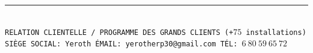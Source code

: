 \documentclass[11pt,a4paper]{memoir}
\begin{document}
\begin{Spacing}{0.75}
\begin{minipage}[t]{42mm}
\begin{flushleft}
{            \vspace*{2mm}
        }
        \end{flushleft}
    \end{minipage}
    \rule{74mm}{0mm}\\
    \vspace{-0.45em}
    \hspace*{-0.45em}
    \texttt{\fontsize{1.83mm}{3.55mm}\selectfont RELATION CLIENTELLE~/~PROGRAMME DES GRANDS CLIENTS (+$75$ installations)\\
    \hspace*{-0.66em}
    \texttt{\fontsize{1.83mm}{3.55mm}\selectfont SI\`EGE SOCIAL: Yeroth \bullet{} \'EMAIL: yerotherp30@gmail.com \bullet{} T\'EL: $6\ 80\ 59\ 65\ 72$}}
    \end{Spacing}
\end{document}
